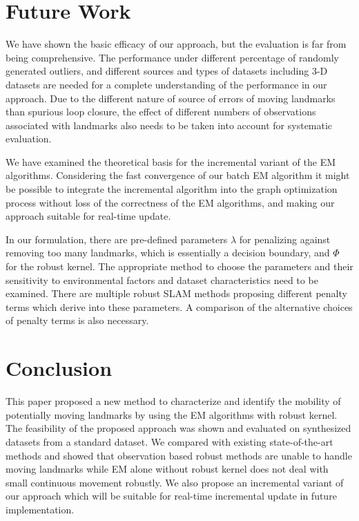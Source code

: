 \section{Future Work}

We have shown the basic efficacy of our approach, but the evaluation is far from being comprehensive. The performance under different percentage of randomly generated outliers, and different sources and types of datasets including 3-D datasets are needed for a complete understanding of the performance in our approach. Due to the different nature of source of errors of moving landmarks than spurious loop closure, the effect of different numbers of observations associated with landmarks also needs to be taken into account for systematic evaluation.

We have examined the theoretical basis for the incremental variant of the EM algorithms. Considering the fast convergence of our batch EM algorithm it might be possible to integrate the incremental algorithm into the graph optimization process without loss of the correctness of the EM algorithms, and making our approach suitable for real-time update.

In our formulation, there are pre-defined parameters $\lambda$ for penalizing against removing too many landmarks, which is essentially a decision boundary, and $\Phi$ for the robust kernel. The appropriate method to choose the parameters and their sensitivity to environmental factors and dataset characteristics need to be examined. There are multiple robust SLAM methods proposing different penalty terms which derive into these parameters. A comparison of the alternative choices of penalty terms is also necessary.

\section{Conclusion}

This paper proposed a new method to characterize and identify the mobility of potentially moving landmarks by using the EM algorithms with robust kernel. The feasibility of the proposed approach was shown and evaluated on synthesized datasets from a standard dataset. We compared with existing state-of-the-art methods and showed that observation based robust methods are unable to handle moving landmarks while EM alone without robust kernel does not deal with small continuous movement robustly. We also propose an incremental variant of our approach which will be suitable for real-time incremental update in future implementation.

